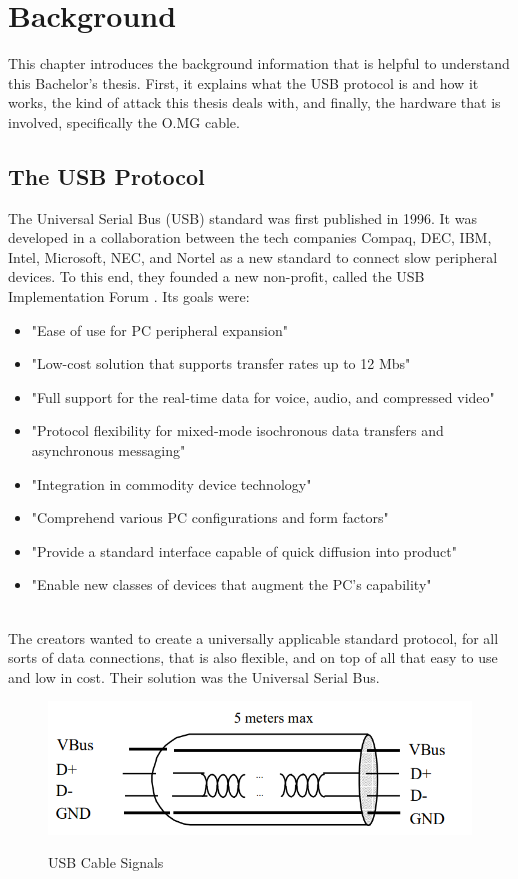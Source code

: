 \chapter{Background} \label{Background}


This chapter introduces the background information that is helpful to understand this Bachelor's thesis. 
First, it explains what the USB protocol is and how it works, the kind of attack this thesis deals with, and finally, the hardware that is involved, specifically the O.MG cable. 

\section{The USB Protocol} \label{TheUSBProtocol}

The Universal Serial Bus (USB) standard \cite{WaybackMachine2018} was first published in 1996. It was developed in a collaboration between the tech companies Compaq, DEC, IBM, Intel, Microsoft, NEC, and Nortel as a new standard to connect slow peripheral devices. To this end, they founded a new non-profit, called the USB Implementation Forum \cite{USBIFUSBIF}. Its goals were:
\begin{itemize}
    \item "Ease of use for PC peripheral expansion"
    \item "Low-cost solution that supports transfer rates up to 12 Mbs"
    \item "Full support for the real-time data for voice, audio, and compressed video"
    \item "Protocol flexibility for mixed-mode isochronous data transfers and asynchronous messaging"
    \item "Integration in commodity device technology"
    \item "Comprehend various PC configurations and form factors"
    \item "Provide a standard interface capable of quick diffusion into product"
    \item "Enable new classes of devices that augment the PC's capability"  
\end{itemize}
\cite[p.~23]{WaybackMachine2018}\\
The creators wanted to create a universally applicable standard protocol, for all sorts of data connections, that is also flexible, and on top of all that easy to use and low in cost. Their solution was the Universal Serial Bus.

\begin{figure}
    \centering
    \includegraphics[width=0.5\linewidth]{visuals/usbsingalgraphic.png}
    \caption{USB Cable Signals}
    \label{fig:usbsingalgraphic}
    \cite{WaybackMachine2018}
\end{figure}

